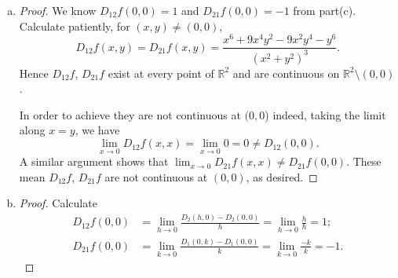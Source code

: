 \begin{Exercise}
\begin{enumerate}[(a)]
		\begin{itemize}
			\item $D_2 f$ is continuous in $\mathbb{R}^2$.  
		\end{itemize}
		\begin{proof}
			Notice that 
			$$
			D_2 f(0,0) 
			= \lim_{k\to 0} \frac{f(0,k) - f(0,0)}{k}
			= 0.
			$$
			Calculate
			\begin{align*}
			D_2 f(x,y) = \frac{x^5-4x^3y^2-xy^4}{(x^2+y^2)^2}, && (x,y)\neq(0,0).
			\end{align*}
			$D_2 f$ is continuous on $\mathbb{R}^2\setminus (0,0)$ trivially, so we consider for $(x,y) = (0,0)$.
			
			Observe that
			\begin{align*}
			|D_2 f(x,y)-D_2 f(0,0)|
			&= \left| \frac{x^5-4x^3y^2-xy^4}{(x^2+y^2)^2} \right| \\
			&= \left| \frac{x(x^2-y^2)}{x^2+y^2} - \frac{4x^3y^2}{(x^2+y^2)^2} \right| \\
			&\leq \left| \frac{x(x^2-y^2)}{x^2+y^2} \right| + \left| \frac{4x^3y^2}{(x^2+y^2)^2} \right| \\
			&\leq |x| + \left| \frac{4x^3y^2}{(x^2+y^2)^2} \right| & (\because |x^2-y^2| \leq |x^2+y^2|) \\
			&\leq |x| + |x| & (\because 2|xy|\leq x^2+y^2) \\
			&= 2|x| \to 0 \text{ as } (x,y) \to (0,0).
			\end{align*}
			Since $D_2 f(0,0) = 0 = \lim_{(x,y)\to(0,0)}$, then $D_2 f$ is continuous at $(0,0)$.
			Hence we conclude $D_2 f$ is continuous in $\mathbb{R}^2$.
		\end{proof}
		
		\item
		\begin{proof}
			We know $D_{12} f(0,0) = 1$ and $D_{21} f(0,0) = -1$ from part(c).
			Calculate patiently, for $(x,y)\neq (0,0)$,
			$$
			D_{12} f(x,y) 
			= D_{21} f(x,y) 
			= \frac{x^6+9x^4y^2-9x^2y^4-y^6}{(x^2+y^2)^3}.
			$$
			Hence $D_{12} f$, $D_{21} f$ exist at every point of $\mathbb{R}^2$ and are continuous on $\mathbb{R}^2\setminus (0,0)$.
			
			In order to achieve they are not continuous at $(0,0$) indeed, taking the limit along $x=y$, we have
			$$
			\lim_{x\to 0}D_{12} f(x,x) 
			= \lim_{x\to 0} 0 
			= 0
			\neq D_{12} (0,0).
			$$
			A similar argument shows that $\lim_{x\to 0}D_{21} f(x,x) \neq D_{21}f(0,0)$.
			These mean $D_{12} f$, $D_{21} f$ are not continuous at $(0,0)$, as desired.
		\end{proof}
		
		\item
		\begin{proof}
			Calculate
			\begin{align*}
			D_{12} f(0,0)
			&= \lim_{h\to 0} \frac{D_2(h,0) - D_2(0,0)}{h}
			= \lim_{h\to 0} \frac{h}{h} 
			= 1; \\
			D_{21} f(0,0)
			&= \lim_{k\to 0} \frac{D_1(0,k) - D_1(0,0)}{k}
			= \lim_{k\to 0} \frac{-k}{k}
			= -1.
			\end{align*}
		\end{proof}
	\end{enumerate}
\end{Exercise}